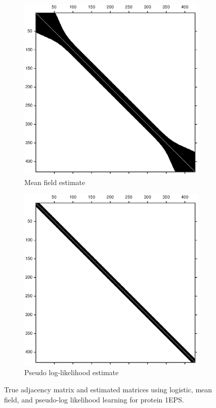 \documentclass{article}
\begin{document}
\begin{figure}[H]
\begin{subfigure}{0.45\textwidth}
\includegraphics[width=\linewidth]{paper_images/mf_adj.eps}
\caption{Mean field estimate}
\label{fig:mf_adj}
\end{subfigure}
\begin{subfigure}{0.45\textwidth}
\includegraphics[width=\linewidth]{paper_images/pll_adj.eps}
\caption{Pseudo log-likelihood estimate}
\label{fig:pll_adj}
\end{subfigure}
\caption{True adjacency matrix and estimated matrices using logistic, mean field, and pseudo-log likelihood learning for protein 1EPS.}
\label{fig:adjacency_estimate}
\end{figure}
\end{document}

